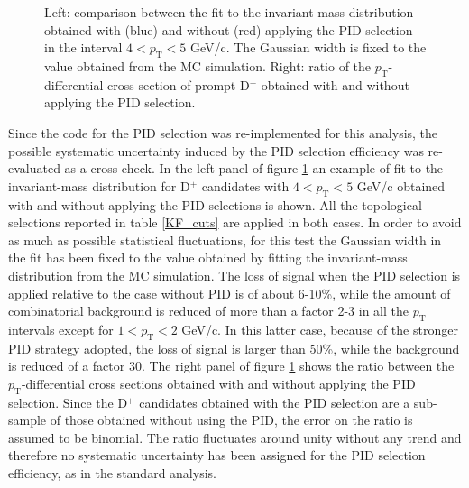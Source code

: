 \documentclass[b5paper,10pt,twoside,oldstyle,classica]{toptesi}
\newcommand{\pt}{p_\text{T}}
\begin{document}
\begin{figure}[tb]
\begin{center}
\caption{Left: comparison between the fit to the invariant-mass distribution obtained with (blue) and without (red) applying the PID selection in the interval $4<\pt<5$ GeV/c. The Gaussian width is fixed to the value obtained from the MC simulation. Right: ratio of the $\pt$-differential cross section of prompt D$^+$ obtained with and without applying the PID selection.}
\label{KF_PID_syst}
\end{center}
\end{figure} 
Since the code for the PID selection was re-implemented for this analysis, the possible systematic uncertainty induced by the PID selection efficiency was re-evaluated as a cross-check. In the left panel of figure \ref{KF_PID_syst} an example of fit to 
the invariant-mass distribution for D$^+$ candidates with $4<\pt<5$ GeV/c obtained with and without applying the PID selections is shown. All the topological selections reported in table \ref{KF_cuts} are applied in both cases. In order to avoid as much as possible statistical fluctuations, for this test the Gaussian width in the fit has been fixed to the value obtained by fitting the invariant-mass distribution from the MC simulation. The loss of signal when the PID selection is applied relative to the case without PID is of about 6-10\%, while the amount of combinatorial background is reduced of more than a factor 2-3 in all the $\pt$ intervals except for $1<\pt<2$ GeV/c. In this latter case, because of the stronger PID strategy adopted, the loss of signal is larger than 50\%, while the background is reduced of a factor 30. The right panel of figure \ref{KF_PID_syst} shows the ratio between the $\pt$-differential cross sections obtained with and without applying the PID selection. Since the D$^+$ candidates obtained with the PID selection are a sub-sample of those obtained without using the PID, the error on the ratio is assumed to be binomial. The ratio fluctuates around unity without any trend and therefore no systematic uncertainty has been assigned for the PID selection efficiency, as in the standard analysis.
\end{document}
